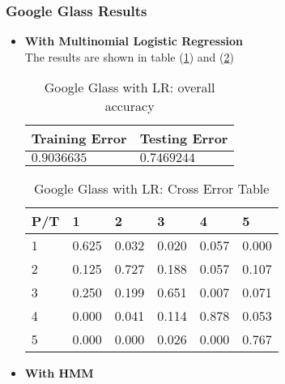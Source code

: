 \subsubsection{Google Glass Results}
\label{sec:glassresult}
\begin{itemize}
\item \textbf{With Multinomial Logistic Regression} \\
The results are shown in table (\ref{tab:glassLR1}) and (\ref{tab:glassLR2})
\begin{table}
\begin{center}
\begin{tabular}{|l|l|}
      \hline
      Training Error & Testing Error\\
      \hline
      $0.9036635$ & $0.7469244$ \\
      \hline
\end{tabular}
\caption{Google Glass with LR: overall accuracy}
\label{tab:glassLR1}
\end{center}
\end{table}

\begin{table}
\begin{center}
\begin{tabular}{|l|l|l|l|l|l|}
      \hline
      P/T& 1 & 2 &3 & 4 & 5 \\
      \hline
      1 &0.625&0.032&0.020&0.057&0.000\\
      2 &0.125&0.727&0.188&0.057&0.107\\
      3 &0.250&0.199&0.651&0.007&0.071\\
      4 &0.000&0.041&0.114&0.878&0.053\\
      5 & 0.000&0.000&0.026&0.000&0.767\\
      \hline
\end{tabular}
\caption{Google Glass with LR: Cross Error Table}
\label{tab:glassLR2}
\end{center}
\end{table}

\item \textbf{With HMM}


\end{itemize}
